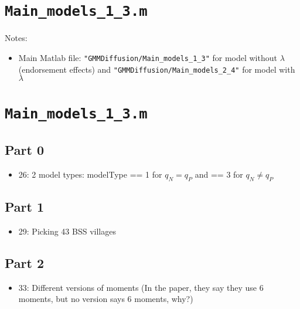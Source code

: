 \documentclass[10pt,letterpaper]{article}
\author{Mizuhiro Suzuki}
\title{}
\begin{document}
\maketitle

\tableofcontents

\section{}

\section{\texttt{Main\_models\_1\_3.m}}\label{main_models_1_3}

Notes:
\begin{itemize}
  \item Main Matlab file: \texttt{"GMMDiffusion/Main\_models\_1\_3"} for model without $\lambda$ (endorsement effects) and \texttt{"GMMDiffusion/Main\_models\_2\_4"} for model with $\lambda$
\end{itemize}

\section{\texttt{Main\_models\_1\_3.m}}\label{main_models_1_3}

\subsection*{Part 0}
\begin{itemize}
  \item 26: 2 model types: modelType == 1 for $q_N = q_P$ and == 3 for $q_N \ne q_P$
\end{itemize}

\subsection*{Part 1}
\begin{itemize}
	\item 29: Picking 43 BSS villages
\end{itemize}

\subsection*{Part 2}
\begin{itemize}
  \item 33: Different versions of moments
    (In the paper, they say they use 6 moments, but no version says 6 moments, why?)
\end{itemize}
\end{document}
